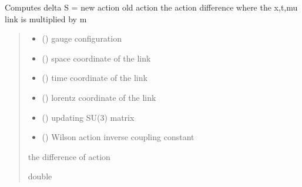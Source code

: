 \documentclass[letterpaper,10pt,english]{sphinxmanual}
\begin{document}

\begin{fulllineitems}
\label{\detokenize{gauge_su3:gauge_su3.calculate_diff_action}}
\pysigstartsignatures
\pysiglinewithargsret
{}
{\sphinxparamcomma {}\sphinxparamcomma {}\sphinxparamcomma {}\sphinxparamcomma {}\sphinxparamcomma {}}
{}
\pysigstopsignatures
\sphinxAtStartPar
Computes delta S = new action \sphinxhyphen{} old action the action difference where the x,t,mu link is multiplied by m
\begin{quote}\begin{description}
\begin{itemize}
\item {} 
\sphinxAtStartPar
{} () \textendash{} gauge configuration

\item {} 
\sphinxAtStartPar
{} () \textendash{} space coordinate of the link

\item {} 
\sphinxAtStartPar
{} () \textendash{} time coordinate of the link

\item {} 
\sphinxAtStartPar
{} () \textendash{} lorentz coordinate of the link

\item {} 
\sphinxAtStartPar
{} () \textendash{} updating SU(3) matrix

\item {} 
\sphinxAtStartPar
{} () \textendash{} Wilson action inverse coupling constant

\end{itemize}

\sphinxAtStartPar
the difference of action

\sphinxAtStartPar
double

\end{description}\end{quote}

\end{fulllineitems}
\end{document}

